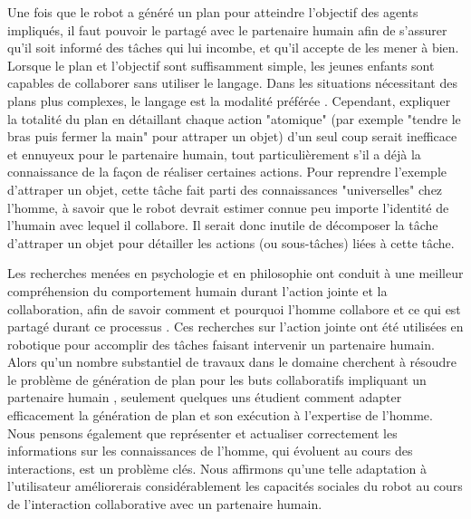 \documentclass[a4paper,11pt,twoside]{StyleThese}
\begin{document}
Une fois que le robot a généré un plan pour atteindre l'objectif des agents impliqués, il faut pouvoir le partagé avec le partenaire humain afin de s'assurer qu'il soit informé des tâches qui lui incombe, et qu'il accepte de les mener à bien. Lorsque le plan et l'objectif sont suffisamment simple, les jeunes enfants sont capables de collaborer sans utiliser le langage. Dans les situations nécessitant des plans plus complexes, le langage est la modalité préférée \cite{Warneken2006,Warneken2007}. Cependant, expliquer la totalité du plan en détaillant chaque action "atomique" (par exemple "tendre le bras puis fermer la main" pour attraper un objet) d'un seul coup serait inefficace et ennuyeux pour le partenaire humain, tout particulièrement s'il a déjà la connaissance de la façon de réaliser certaines actions. Pour reprendre l'exemple d'attraper un objet, cette tâche fait parti des connaissances "universelles" chez l'homme, à savoir que le robot devrait estimer connue peu importe l'identité de l'humain avec lequel il collabore. Il serait donc inutile de décomposer la tâche d'attraper un objet pour détailler les actions (ou sous-tâches) liées à cette tâche. 

Les recherches menées en psychologie et en philosophie ont conduit à une meilleur compréhension du comportement humain durant l'action jointe et la collaboration, afin de savoir comment \cite{tomasello2005} et pourquoi \cite{tomasello2009} l'homme collabore et ce qui est partagé durant ce processus \cite{Butterfill2011}.
%
%
%
%
Ces recherches sur l'action jointe ont été utilisées en robotique pour accomplir des tâches faisant intervenir un partenaire humain. Alors qu'un nombre substantiel de travaux dans le domaine cherchent à résoudre le problème de génération de plan pour les buts collaboratifs impliquant un partenaire humain \cite{lallement14}, seulement quelques uns étudient comment adapter efficacement la génération de plan et son exécution à l'expertise de l'homme. Nous pensons également que représenter et actualiser correctement les informations sur les connaissances de l'homme, qui évoluent au cours des interactions, est un problème clés. Nous affirmons qu'une telle adaptation à l'utilisateur améliorerais considérablement les capacités sociales du robot au cours de l'interaction collaborative avec un partenaire humain.
\end{document}
